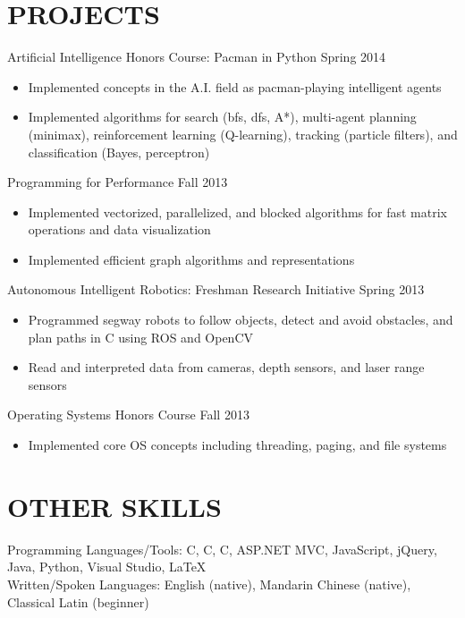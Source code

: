 \documentclass[margin]{res}
\newcommand{\PLUS}{\nolinebreak\hspace{-.05em}\raisebox{.4ex}{\tiny\bf+}}
\newcommand{\CC}{C\PLUS{}\PLUS{}}
\newcommand{\CS}{C\nolinebreak\hspace{-.05em}\raisebox{.4ex}{\scriptsize\bf \#}}
\begin{document}
\begin{resume}
\section{PROJECTS}

	Artificial Intelligence Honors Course: Pacman in Python \hfill Spring 2014
	\begin{itemize} \itemsep -2pt
	\item Implemented concepts in the A.I. field as pacman-playing intelligent agents
	\item Implemented algorithms for search (bfs, dfs, A*), multi-agent planning (minimax), reinforcement learning (Q-learning), tracking (particle filters), and classification (Bayes, perceptron)
	\end{itemize}

	Programming for Performance \hfill Fall 2013
	\begin{itemize} \itemsep -2pt
	\item Implemented vectorized, parallelized, and blocked algorithms for fast matrix operations and data visualization
	\item Implemented efficient graph algorithms and representations
	\end{itemize}

	Autonomous Intelligent Robotics: Freshman Research Initiative \hfill Spring 2013
	\begin{itemize} \itemsep -2pt
	\item Programmed segway robots to follow objects, detect and avoid obstacles, and plan paths in \CC{} using ROS and OpenCV
	\item Read and interpreted data from cameras, depth sensors, and laser range sensors
	\end{itemize}

	Operating Systems Honors Course \hfill Fall 2013
	\begin{itemize} \itemsep -2pt
	\item Implemented core OS concepts including threading, paging, and file systems
	\end{itemize}

\section{OTHER SKILLS}
	Programming Languages/Tools: C, \CC{}, \CS{}, ASP.NET MVC, JavaScript, jQuery, Java, Python, Visual Studio, \LaTeX\\
	Written/Spoken Languages: English (native), Mandarin Chinese (native), Classical Latin (beginner)

\end{resume}
\end{document}
